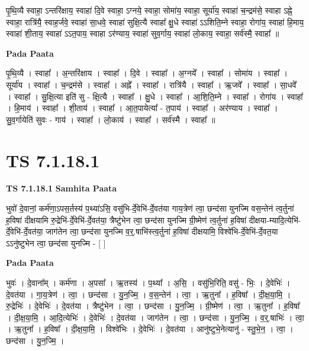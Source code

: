 \documentclass[17pt]{extarticle}
\begin{document}
पृ॒थि॒व्यै स्वाहा॒ ऽन्तरि॑क्षाय॒ स्वाहा॑ दि॒वे स्वाहा॒ ऽग्नये॒ स्वाहा॒ सोमा॑य॒ स्वाहा॒ सूर्या॑य॒ स्वाहा॑ च॒न्द्रम॑से॒ स्वाहा ऽह्ने॒ स्वाहा॒ रात्रि॑यै॒ स्वाह॒र्जवे॒ स्वाहा॑ सा॒धवे॒ स्वाहा॑ सुक्षि॒त्यै स्वाहा᳚ क्षु॒धे स्वाहा॑ ऽऽशिति॒म्ने स्वाहा॒ रोगा॑य॒ स्वाहा॑ हि॒माय॒ स्वाहा॑ शी॒ताय॒ स्वाहा॑ ऽऽत॒पाय॒ स्वाहा ऽर॑ण्याय॒ स्वाहा॑ सुव॒र्गाय॒ स्वाहा॑ लो॒काय॒ स्वाहा॒ सर्व॑स्मै॒ स्वाहा᳚ ॥ \newline

\textbf{Pada Paata} \newline

पृ॒थि॒व्यै । स्वाहा᳚ । अ॒न्तरि॑क्षाय । स्वाहा᳚ । दि॒वे । स्वाहा᳚ । अ॒ग्नये᳚ । स्वाहा᳚ । सोमा॑य । स्वाहा᳚ । सूर्या॑य । स्वाहा᳚ । च॒न्द्रम॑से । स्वाहा᳚ । अह्ने᳚ । स्वाहा᳚ । रात्रि॑यै । स्वाहा᳚ । ऋ॒जवे᳚ । स्वाहा᳚ । सा॒धवे᳚ । स्वाहा᳚ । सु॒क्षि॒त्या इति॑ सु - क्षि॒त्यै । स्वाहा᳚ । क्षु॒धे । स्वाहा᳚ । आ॒शि॒ति॒म्ने । स्वाहा᳚ । रोगा॑य । स्वाहा᳚ । हि॒माय॑ । स्वाहा᳚ । शी॒ताय॑ । स्वाहा᳚ । आ॒त॒पायेत्या᳚ - त॒पाय॑ । स्वाहा᳚ । अर॑ण्याय । स्वाहा᳚ । सु॒व॒र्गायेति॑ सुवः - गाय॑ । स्वाहा᳚ । लो॒काय॑ । स्वाहा᳚ । सर्व॑स्मै । स्वाहा᳚ ॥  \newline





\section{ TS 7.1.18.1 }

\textbf{TS 7.1.18.1 } \newline
\textbf{Samhita Paata} \newline

भुवो॑ दे॒वानां॒ कर्म॑णा॒ऽपस॒र्तस्य॑ प॒थ्या॑ऽसि॒ वसु॑भि-र्दे॒वेभि॑-र्दे॒वत॑या गाय॒त्रेण॑ त्वा॒ छन्द॑सा युनज्मि वस॒न्तेन॑ त्व॒र्तुना॑ ह॒विषा॑ दीक्षयामि रु॒द्रेभि॑-र्दे॒वेभि॑-र्दे॒वत॑या॒ त्रैष्टु॑भेन त्वा॒ छन्द॑सा युनज्मि ग्री॒ष्मेण॑ त्व॒र्तुना॑ ह॒विषा॑ दीक्षया-म्यादि॒त्येभि॑-र्दे॒वेभि॑-र्दे॒वत॑या॒ जाग॑तेन त्वा॒ छन्द॑सा युनज्मि व॒र्॒.षाभि॑स्त्व॒र्तुना॑ ह॒विषा॑ दीक्षयामि॒ विश्वे॑भि-र्दे॒वेभि॑-र्दे॒वत॒या ऽऽनु॑ष्टुभेन त्वा॒ छन्द॑सा युनज्मि - [  ] \newline

\textbf{Pada Paata} \newline

भुवः॑ । दे॒वाना᳚म् । कर्म॑णा । अ॒पसा᳚ । ऋ॒तस्य॑ । प॒थ्या᳚ । अ॒सि॒ । वसु॑भि॒रिति॒ वसु॑ - भिः॒ । दे॒वेभिः॑ । दे॒वत॑या । गा॒य॒त्रेण॑ । त्वा॒ । छन्द॑सा । यु॒न॒ज्मि॒ । व॒स॒न्तेन॑ । त्वा॒ । ऋ॒तुना᳚ । ह॒विषा᳚ । दी॒क्ष॒या॒मि॒ । रु॒द्रेभिः॑ । दे॒वेभिः॑ । दे॒वत॑या । त्रैष्टु॑भेन । त्वा॒ । छन्द॑सा । यु॒न॒ज्मि॒ । ग्री॒ष्मेण॑ । त्वा॒ । ऋ॒तुना᳚ । ह॒विषा᳚ । दी॒क्ष॒या॒मि॒ । आ॒दि॒त्येभिः॑ । दे॒वेभिः॑ । दे॒वत॑या । जाग॑तेन । त्वा॒ । छन्द॑सा । यु॒न॒ज्मि॒ । व॒र्॒.षाभिः॑ । त्वा॒ । ऋ॒तुना᳚ । ह॒विषा᳚ । दी॒क्ष॒या॒मि॒ । विश्वे॑भिः । दे॒वेभिः॑ । दे॒वत॑या । आनु॑ष्टुभे॒नेत्यानु॑ - स्तु॒भे॒न॒ । त्वा॒ । छन्द॑सा । यु॒न॒ज्मि॒ ।  \newline
\end{document}
